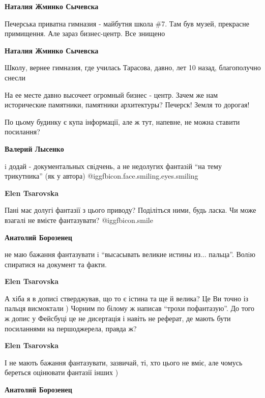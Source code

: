 \begin{itemize}
\begin{itemize}
\textbf{Наталия Жминко Сычевска} 

Печерська приватна гимназия - майбутня школа \#7. Там був музей, прекрасне
примищення. Але зараз бизнес-центр. Все знищено

\textbf{Наталия Жминко Сычевска} 

Школу, вернее гимназия, где училась Тарасова, давно, лет 10 назад, благополучно
снесли

На ее месте давно высочеет огромный бизнес - центр. Зачем же нам исторические
памятники, памятники архитектуры? Печерск! Земля то дорогая!

\end{itemize} %


По цьому будинку є купа інформації, але ж тут, напевне, не можна ставити
посилання?

\begin{itemize} %
\textbf{Валерий Лысенко} 

i додай - документальных свiдчень, а не недолугих фантазiй \enquote{на тему трикутника}
(як у автора) @igg{fbicon.face.smiling.eyes.smiling} 

\begin{itemize} %
\textbf{Elen Tsarovska} 

Пані має долугі фантазії з цього приводу? Поділіться ними, будь ласка. Чи може
взагалі не вмієте фантазувати?  @igg{fbicon.smile} 

\textbf{Анатолий Борозенец} 

не маю бажання фантазувати i \enquote{высасывать великие истины из... пальца}.
Волiю спиратися на документ та факти.

\textbf{Elen Tsarovska} 

А хіба я в дописі стверджував, що то є істина та ще й велика? Це Ви точно із
пальця висмоктали ) Чорним по білому ж написав \enquote{трохи пофантазую}. До того ж
допис у Фейсбуці це не дисертація і навіть не реферат, де мають бути
посиланнями на першоджерела, правда ж?

\textbf{Elen Tsarovska} 

І не мають бажання фантазувати, зазвичай, ті, хто цього не вміє, але чомусь
береться оцінювати фантазії інших )

\textbf{Анатолий Борозенец} 


\end{itemize}
\end{itemize}
\end{itemize}
